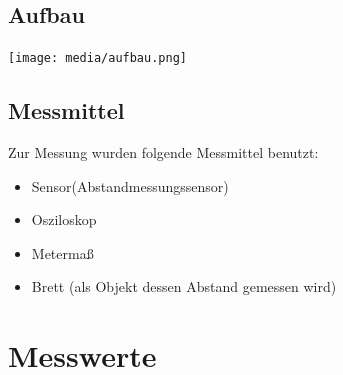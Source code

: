 	
\subsection*{Aufbau}

\begin{center}
	\texttt{[image: media/aufbau.png]}
	\label{Fig:Versuchsaufbau}
\end{center}
	
\pagebreak	
\subsection*{Messmittel}
	Zur Messung wurden folgende Messmittel benutzt:
	\begin{itemize}
		\item Sensor(Abstandmessungssensor)
		\item Osziloskop		
		\item Metermaß
		\item Brett (als Objekt dessen Abstand gemessen wird)
	\end{itemize}

\pagebreak
\section{Messwerte}
\label{chap:VERSUCH_1_MESSWERTE}
	
